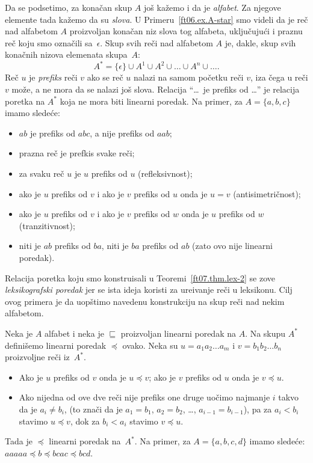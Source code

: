 \begin{EX}
  Da se podsetimo, za kona\v can skup $A$ jo\v s ka\v zemo i da je \emph{alfabet}.
  Za njegove elemente tada ka\v zemo da su \emph{slova}.
  U Primeru~\ref{ft06.ex.A-star} smo videli da je re\v c nad alfabetom $A$ proizvoljan kona\v can niz slova tog alfabeta,
  uklju\v cuju\'ci i praznu re\v c koju smo ozna\v cili sa~$\epsilon$.
  Skup svih re\v ci nad alfabetom $A$ je, dakle, skup svih kona\v cnih nizova elemenata skupa~$A$:
  $$
    A^* = \{\epsilon\} \cup A^1 \cup A^2 \cup \ldots \cup A^n \cup \ldots.
  $$
  Re\v c $u$ je \emph{prefiks} re\v ci $v$ ako se re\v c $u$ nalazi na samom po\v cetku re\v ci $v$, iza \v cega u re\v ci
  $v$ mo\v ze, a ne mora da se nalazi jo\v s slova. Relacija ``\ldots\ je prefiks od \ldots'' je relacija poretka
  na $A^*$ koja ne mora biti linearni poredak. Na primer, za $A = \{a, b, c\}$ imamo slede\'ce:
  \begin{itemize}\itemsep -1.5pt
  \item
    $ab$ je prefiks od $abc$, a nije prefiks od $aab$;
  \item
    prazna re\v c je prefkis svake re\v ci;
  \item
    za svaku re\v c $u$ je $u$ prefiks od $u$ (refleksivnost);
  \item
    ako je $u$ prefiks od $v$ i ako je $v$ prefiks od $u$ onda je $u = v$ (antisimetri\v cnost);
  \item
    ako je $u$ prefiks od $v$ i ako je $v$ prefiks od $w$ onda je $u$ prefiks od $w$ (tranzitivnost);
  \item
    niti je $ab$ prefiks od $ba$, niti je $ba$ prefiks od $ab$ (zato ovo nije linearni poredak).
  \end{itemize}
\end{EX}

\begin{EX}
  Relacija poretka koju smo konstruisali u Teoremi~\ref{ft07.thm.lex-2} se zove \emph{leksikografski poredak} jer se ista ideja
  koristi za ure\dj ivanje re\v ci u leksikonu. Cilj ovog primera je da uop\v stimo navedenu konstrukciju na skup re\v ci nad
  nekim alfabetom.
  
  Neka je $A$ alfabet i neka je $\sqsubseteq$ proizvoljan linearni poredak na $A$. Na skupu $A^*$
  defini\v semo linearni poredak $\preccurlyeq$ ovako. Neka su $u = a_1 a_2 \ldots a_m$ i $v = b_1 b_2 \ldots b_n$ proizvoljne
  re\v ci iz~$A^*$.
  \begin{itemize}
  \item
    Ako je $u$ prefiks od $v$ onda je $u \preccurlyeq v$; ako je $v$ prefiks od $u$ onda je $v \preccurlyeq u$.
  \item
    Ako nijedna od ove dve re\v ci nije prefiks one druge uo\v cimo najmanje $i$ takvo da je $a_i \ne b_i$,
    (to zna\v ci da je $a_1 = b_1$, $a_2 = b_2$, \ldots, $a_{i-1} = b_{i-1}$), pa za $a_i < b_i$ stavimo
    $u \preccurlyeq v$, dok za $b_i < a_i$ stavimo $v \preccurlyeq u$.
  \end{itemize}
  Tada je $\preccurlyeq$ linearni poredak na~$A^*$.
  Na primer, za $A = \{a, b, c, d\}$ imamo slede\'ce: $aaaaa \preccurlyeq b \preccurlyeq bcac \preccurlyeq bcd$.
\end{EX}

